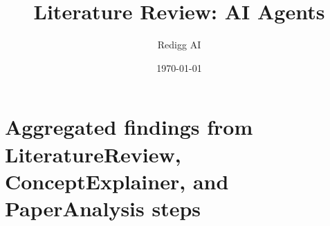 \documentclass[12pt,a4paper]{article}
\title{Literature Review: AI Agents}
\author{Redigg AI}
\date{\today}
\begin{document}
\maketitle

\section{Aggregated findings from LiteratureReview, ConceptExplainer, and PaperAnalysis steps}
\end{document}
